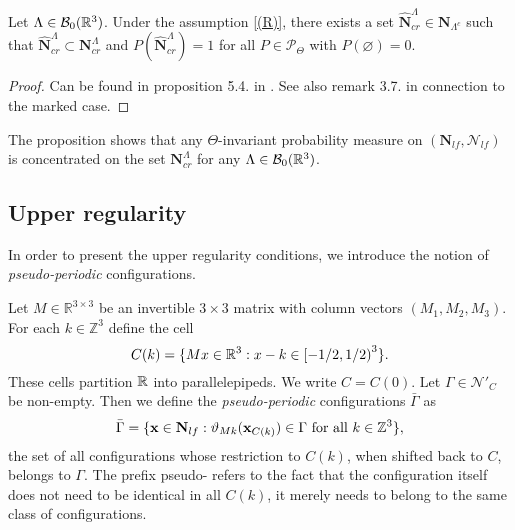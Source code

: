 \begin{proposition}\label{prop:cr-a.s.}
	Let $\Lambda \in \mathcal B_0({\mathbb R^3})$. Under the assumption \ref{(R)}, there exists a set $\hat {\mathbf N}^\Lambda_{cr} \in \mathbf N_{\Lambda^c}$ such that $\hat {\mathbf N}^\Lambda_{cr} \subset \mathbf N^\Lambda_{cr}$ and $P(\hat {\mathbf N}^\Lambda_{cr})=1$ for all $P \in \mathcal P_\Theta$ with $P(\varnothing)=0$.
\end{proposition}
\begin{proof}
	Can be found in proposition 5.4. in \cite{DDG12}. See also remark 3.7. in connection to the marked case.
\end{proof}

The proposition shows that any $\Theta$-invariant probability measure on $(\mathbf N_{lf},\mathcal N_{lf})$ is concentrated on the set $\mathbf N^\Lambda_{cr}$ for any $\Lambda \in \mathcal B_0({\mathbb R^3})$.

\subsection{Upper regularity}


In order to present the upper regularity conditions, we introduce the notion of \textit{pseudo-periodic} configurations. 

Let $M\in\mathbb R^{3\times 3}$ be an invertible $3\times 3$ matrix with column vectors $(M_1,M_2,M_3)$. For each $k \in \mathbb Z^3$ define the cell
$$C(k) =  \{Mx \in {\mathbb R^3}: x-k \in \left[ -1/2, 1/2 \right)^3 \}.$$
These cells partition $\mathbb{R}$ into parallelepipeds. We write $C=C(0)$. Let  $\Gamma \in \mathcal N'_C$ be non-empty. Then we define the \textit{pseudo-periodic} configurations $\bar \Gamma$ as
$$\bar \Gamma = \{ {\mathbf{x}} \in \mathbf N_{lf}: \vartheta_{Mk}({\mathbf{x}}_{C(k)}) \in \Gamma \text{ for all } k \in \mathbb Z^3 \},$$
the set of all configurations whose restriction to $C(k)$, when shifted back to $C$, belongs to $\Gamma$. The prefix pseudo- refers to the fact that the configuration itself does not need to be identical in all $C(k)$, it merely needs to belong to the same class of configurations.

